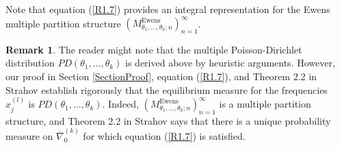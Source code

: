 \documentclass[12pt]{amsart}
\theoremstyle{definition}
\newtheorem{rem}[thm]{Remark}
\numberwithin{equation}{section}
\DeclareMathOperator{\Ewens}{Ewens}
\begin{document}
Note that equation (\ref{R1.7}) provides an integral representation for the Ewens multiple partition structure
$\left(M^{\Ewens}_{\theta_1,\ldots,\theta_k;n}\right)_{n=1}^{\infty}$.
\begin{rem} The reader might note that the multiple Poisson-Dirichlet distribution
$PD(\theta_1,\ldots,\theta_k)$ is derived above by heuristic arguments. However, our proof in Section \ref{SectionProof}, equation (\ref{R1.7}), and Theorem 2.2 in Strahov \cite{StrahovMPS} establish rigorously that the equilibrium
measure for the frequencies $x_j^{(l)}$
is $PD\left(\theta_1,\ldots,\theta_k\right)$. Indeed, $\left(M_{\theta_1,\ldots,\theta_k;n}^{\Ewens}\right)_{n=1}^{\infty}$ is a multiple partition structure, and Theorem 2.2  in Strahov \cite{StrahovMPS} says that there is a unique probability
measure on $\overline{\nabla}_0^{(k)}$ for which equation (\ref{R1.7}) is satisfied.
\end{rem}

\end{document}
